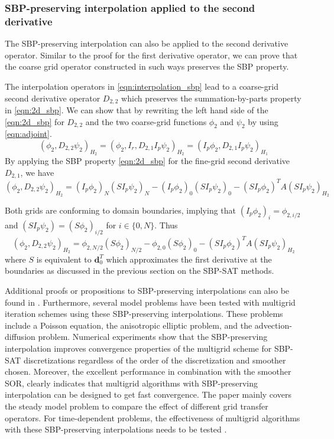 \subsubsection{SBP-preserving interpolation applied to the second derivative}
The SBP-preserving interpolation can also be applied to the second derivative operator. Similar to the proof for the first derivative operator, we can prove that the coarse grid operator constructed in such ways preserves the SBP property.

The interpolation operators in \autoref{eqn:interpolation_sbp} lead to a coarse-grid second derivative operator $D_{2,2}$ which preserves the summation-by-parts property in \autoref{eqn:2d_sbp}. We can show that by rewriting the left hand side of the \autoref{eqn:2d_sbp} for $D_{2,2}$ and the two coarse-grid functions $\phi_2$ and $\psi_2$ by using \autoref{eqn:adjoint}.
\begin{equation}
    (\phi_2,D_{2,2}\psi_2)_{H_2} = (\phi_2,I_r,D_{2,1}I_p\psi_2)_{H_2} = (I_p\phi_2,D_{2,1}I_p\psi_2)_{H_1}
\end{equation}
By applying the SBP property \autoref{eqn:2d_sbp} for the fine-grid second derivative $D_{2,1}$, we have
\begin{equation}
    (\phi_2,D_{2,2}\psi_2)_{H_2} = (I_p\phi_2)_N(SI_p\psi_2)_N - (I_p\phi_2)_0(SI_p\psi_2)_0 - (SI_p\phi_2)^TA(SI_p\psi_2)_{H_2}
\end{equation}

Both grids are conforming to domain boundaries, implying that $(I_p\phi_2)_i = \phi_{2,i/2}$ and $(SI_p\psi_2) = (S\phi_2)_{i/2}$ for $i\in\{0,N\}$. Thus 
\begin{equation}
     (\phi_2,D_{2,2}\psi_2)_{H_2} = \phi_{2,N/2}(S\phi_2)_{N/2} - \phi_{2,0}(S\phi_2)_0 - (SI_p\phi_2)^TA(SI_p\psi_2)_{H_2}
\end{equation}
where $S$ is equivalent to $\boldsymbol{d}_0^T$ which approximates the first derivative at the boundaries as discussed in the previous section on the SBP-SAT methods.

Additional proofs or propositions to SBP-preserving interpolations can also be found in  \citep{ruggiu2018new}. Furthermore, several model problems have been tested with multigrid iteration schemes using these SBP-preserving interpolations. These problems include a Poisson equation, the anisotropic elliptic problem, and the advection-diffusion problem. Numerical experiments show that the SBP-preserving interpolation improves convergence properties of the multigrid scheme for SBP-SAT discretizations regardless of the order of the discretization and smoother chosen. Moreover, the excellent performance in combination with the smoother SOR, clearly indicates that multigrid algorithms with SBP-preserving interpolation can be designed to get fast convergence. The paper mainly covers the steady model problem to compare the effect of different grid transfer operators. For time-dependent problems, the effectiveness of multigrid algorithms with these SBP-preserving interpolations needs to be tested \citep{ruggiu2018new}.



